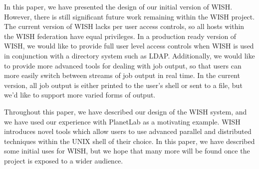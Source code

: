  \label{sec:conclusion}

In this paper, we have presented the design of our initial version of WISH.
However, there is still significant future work remaining within the WISH
project. The current version of WISH lacks per user access controls, so all
hosts within the WISH federation have equal privileges. In a production ready
version of WISH, we would like to provide full user level access controls when
WISH is used in conjunction with a directory system such as LDAP.
Additionally, we would like to provide more advanced tools for dealing with job
output, so that users can more easily switch between streams of job output in
real time. In the current version, all job output is either printed to the
user's shell or sent to a file, but we'd like to support more varied forms of
output. 

Throughout this paper, we have described our design of the WISH system, and we
have used our experience with PlanetLab as a motivating example. WISH
introduces novel tools which allow users to use advanced parallel and
distributed techniques within the UNIX shell of their choice. In this paper,
we have described some initial uses for WISH, but we hope that many more will be
found once the project is exposed to a wider audience. 

